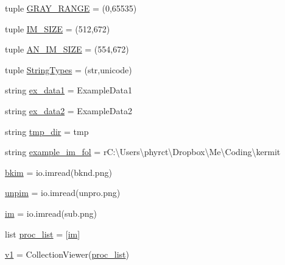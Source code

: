 \begin{DoxyCompactItemize}
\item 
tuple \hyperlink{namespacekermit_a9126e144cfcf0e62c9540ceab41357f6}{G\+R\+A\+Y\+\_\+\+R\+A\+N\+GE} = (0,65535)
\item 
tuple \hyperlink{namespacekermit_a79b097e6dc51ad46c17adc76d122c74e}{I\+M\+\_\+\+S\+I\+ZE} = (512,672)
\item 
tuple \hyperlink{namespacekermit_a3a00797e39aca7adb4a8cbfa3406d08a}{A\+N\+\_\+\+I\+M\+\_\+\+S\+I\+ZE} = (554,672)
\item 
tuple \hyperlink{namespacekermit_aa7fd97127ffdc923b5f393978698c4e2}{String\+Types} = (str,unicode)
\item 
string \hyperlink{namespacekermit_adf8dfb894042e43e52e8c1fb73ee6b5c}{ex\+\_\+data1} = \textquotesingle{}Example\+Data1\textquotesingle{}
\item 
string \hyperlink{namespacekermit_a840f1a32f7048a0fa6a2ccb4d98f52eb}{ex\+\_\+data2} = \textquotesingle{}Example\+Data2\textquotesingle{}
\item 
string \hyperlink{namespacekermit_aecc2d1d7664b16df7d95dcb97870f517}{tmp\+\_\+dir} = \textquotesingle{}tmp\textquotesingle{}
\item 
string \hyperlink{namespacekermit_abbd557f9a28767ae9aca37bb210289f2}{example\+\_\+im\+\_\+fol} = r\textquotesingle{}C\+:\textbackslash{}\+Users\textbackslash{}phyrct\textbackslash{}\+Dropbox\textbackslash{}\+Me\textbackslash{}\+Coding\textbackslash{}kermit\textquotesingle{}
\item 
\hyperlink{namespacekermit_a0744c104c9fe9a76f9518b49a1df33b2}{bkim} = io.\+imread(\textquotesingle{}bknd.\+png\textquotesingle{})
\item 
\hyperlink{namespacekermit_a9fb3ba81b634d3ff357261211ff1c453}{unpim} = io.\+imread(\textquotesingle{}unpro.\+png\textquotesingle{})
\item 
\hyperlink{namespacekermit_ace003936bdb5e0aba435651a827c4293}{im} = io.\+imread(\textquotesingle{}sub.\+png\textquotesingle{})
\item 
list \hyperlink{namespacekermit_a8b94ad1d18d6a20c42cad6d65ed1a781}{proc\+\_\+list} = \mbox{[}\hyperlink{namespacekermit_ace003936bdb5e0aba435651a827c4293}{im}\mbox{]}
\item 
\hyperlink{namespacekermit_afc1e6acdf61366d1c0f44edbc11ff790}{v1} = Collection\+Viewer(\hyperlink{namespacekermit_a8b94ad1d18d6a20c42cad6d65ed1a781}{proc\+\_\+list})
\end{DoxyCompactItemize}



